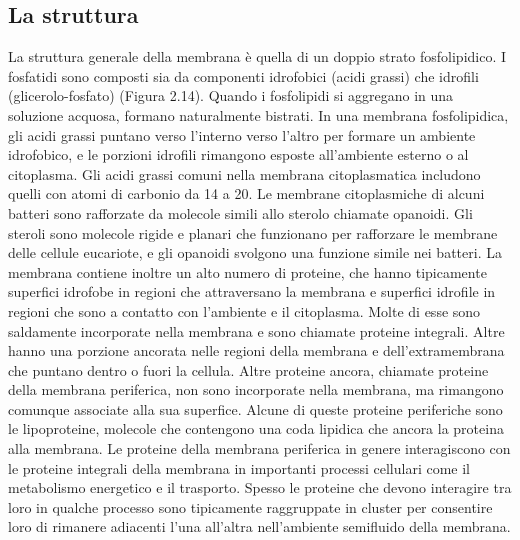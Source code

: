 \subsection{La struttura}
La struttura generale della membrana è quella di un doppio strato fosfolipidico. I fosfatidi sono composti sia da componenti idrofobici (acidi grassi) che 
idrofili (glicerolo-fosfato) (Figura 2.14). Quando i fosfolipidi si aggregano in una soluzione acquosa, formano naturalmente bistrati. In una membrana 
fosfolipidica, gli acidi grassi puntano verso l'interno verso l'altro per formare un ambiente idrofobico, e le porzioni idrofili rimangono esposte 
all'ambiente esterno o al citoplasma. Gli acidi grassi comuni nella membrana citoplasmatica includono quelli con atomi di carbonio da 14 a 20.
Le membrane citoplasmiche di alcuni batteri sono rafforzate da molecole simili allo sterolo chiamate opanoidi. Gli steroli sono molecole rigide e planari 
che funzionano per rafforzare le membrane delle cellule eucariote, e gli opanoidi svolgono una funzione simile nei batteri.
La membrana contiene inoltre un alto numero di proteine, che hanno tipicamente superfici idrofobe in regioni che attraversano la membrana e superfici 
idrofile in regioni che sono a contatto con l'ambiente e il citoplasma. Molte di esse sono saldamente incorporate nella membrana e sono chiamate proteine 
integrali. Altre hanno una porzione ancorata nelle regioni della membrana e dell'extramembrana che puntano dentro o fuori la cellula. Altre proteine ancora, 
chiamate proteine della membrana periferica, non sono incorporate nella membrana, ma rimangono comunque associate alla sua superfice. Alcune di queste 
proteine periferiche sono le lipoproteine, molecole che contengono una coda lipidica che ancora la proteina alla membrana. Le proteine della membrana 
periferica in genere interagiscono con le proteine integrali della membrana in importanti processi cellulari come il metabolismo energetico e il trasporto. 
Spesso le proteine che devono interagire tra loro in qualche processo sono tipicamente raggruppate in cluster per consentire loro di rimanere adiacenti 
l'una all'altra nell'ambiente semifluido della  membrana.
